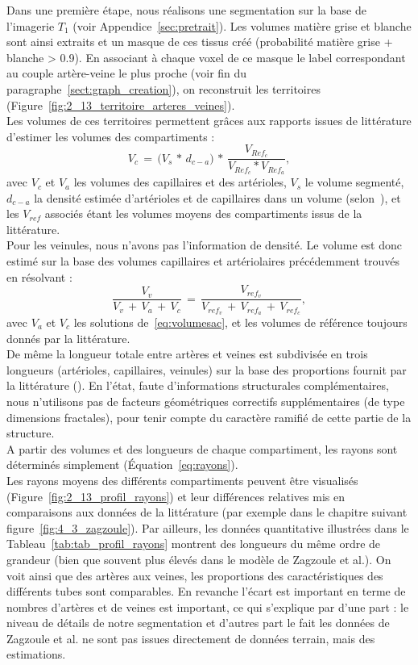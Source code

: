 Dans une première étape, nous réalisons une segmentation sur la base de l’imagerie $T_1$ (voir Appendice~\ref{sec:pretrait}). Les volumes matière grise et blanche sont ainsi extraits et un masque de ces tissus créé (probabilité matière grise + blanche > 0.9). En associant à chaque voxel de ce masque le label correspondant au couple artère-veine le plus proche (voir fin du paragraphe~\ref{sect:graph_creation}), on reconstruit les territoires (Figure~\ref{fig:2_13_territoire_arteres_veines}). \\
Les volumes de ces territoires permettent grâces aux rapports issues de littérature d’estimer les volumes des compartiments : 
\begin{equation}
\label{eq:volumesac}
V_{c}\,=\,\bigl(V_{s}\, *\,d_{c-a}\bigr)\, *\,\frac{V_{Ref_{c}}}{V_{Ref_{c}}*V_{Ref_{a}}},
\end{equation}
avec $V_c$ et $V_a$  les volumes des capillaires et des artérioles, $V_s$ le volume segmenté, $d_{c-a}$ la densité estimée d'artérioles et de capillaires dans un volume (selon~\cite{Moody2004}), et les $V_{ref}$ associés étant les volumes moyens des compartiments issus de la littérature.\\
Pour les veinules, nous n’avons pas l’information de densité. Le volume est donc estimé sur la base des volumes capillaires et artériolaires précédemment trouvés en résolvant : 
\begin{equation}
\frac{V_{v}}{V_v\,+\,V_a\,+\,V_c}\,=\,\frac{V_{ref_{v}}}{V_{ref_{v}}\,+\,V_{ref_{a}}\,+\,V_{ref_{c}}},
\end{equation}
avec $V_a$ et $V_c$ les solutions de~\ref{eq:volumesac}, et les volumes de référence toujours donnés par la littérature.\\
De même la longueur totale entre artères et veines est subdivisée en trois longueurs (artérioles, capillaires, veinules) sur la base des proportions fournit par la littérature (\cite{Zagzoule1986}). En l’état, faute d’informations structurales complémentaires, nous n’utilisons pas de facteurs géométriques correctifs supplémentaires (de type dimensions fractales), pour tenir compte du caractère ramifié de cette partie de la structure. \\
A partir des volumes et des longueurs de chaque compartiment, les rayons sont déterminés simplement (Équation~\ref{eq:rayons}). \\
Les rayons moyens des différents compartiments peuvent être visualisés (Figure~\ref{fig:2_13_profil_rayons}) et leur différences relatives mis en comparaisons aux données de la littérature (par exemple dans le chapitre suivant figure~\ref{fig:4_3_zagzoule}). Par ailleurs, les données quantitative illustrées dans le Tableau~\ref{tab:tab_profil_rayons} montrent des longueurs du même ordre de grandeur (bien que souvent plus élevés dans le modèle de Zagzoule et al.). On voit ainsi que des artères aux veines, les proportions des caractéristiques des différents tubes sont comparables. En revanche l'écart est important en terme de nombres d'artères et de veines est important, ce qui s'explique par d'une part : le niveau de détails de notre segmentation et d'autres part le fait les données de Zagzoule et al. ne sont pas issues directement de données terrain, mais des estimations.\\
